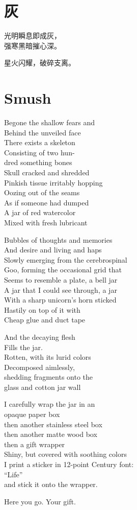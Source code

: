 \documentclass[parskip=full,12pt,oneside,a5paper]{scrbook}
\begin{document}
\endgroup

\chapter{灰}
\begingroup\addtolength{\baselineskip}{0.75ex}

光明瞬息即成灰，\\
强寒黑暗摧心深。

星火闪耀，破碎支离。

\endgroup

\chapter{Smush}

Begone the shallow fears and\\
Behind the unveiled face\\
There exists a skeleton\\
Consisting of two hun-\\
dred something bones\\
Skull cracked and shredded\\
Pinkish tissue irritably hopping\\
Oozing out of the seams\\
As if someone had dumped\\
A jar of red watercolor\\
Mixed with fresh lubricant

Bubbles of thoughts and memories\\
And desire and living and haps\\
Slowly emerging from the cerebrospinal\\
Goo, forming the occasional grid that\\
Seems to resemble a plate, a bell jar\\
A jar that I could see through, a jar\\
With a sharp unicorn's horn sticked\\
Hastily on top of it with\\
Cheap glue and duct tape

And the decaying flesh\\
Fills the jar.\\
Rotten, with its lurid colors\\
Decomposed aimlessly,\\
shedding fragments onto the\\
glass and cotton jar wall

I carefully wrap the jar in an\\
opaque paper box\\
then another stainless steel box\\
then another matte wood box\\
then a gift wrapper\\
Shiny, but covered with soothing colors\\
I print a sticker in 12-point Century font:\\
\qquad ``Life''\\
and stick it onto the wrapper.

Here you go. Your gift.
\end{document}
